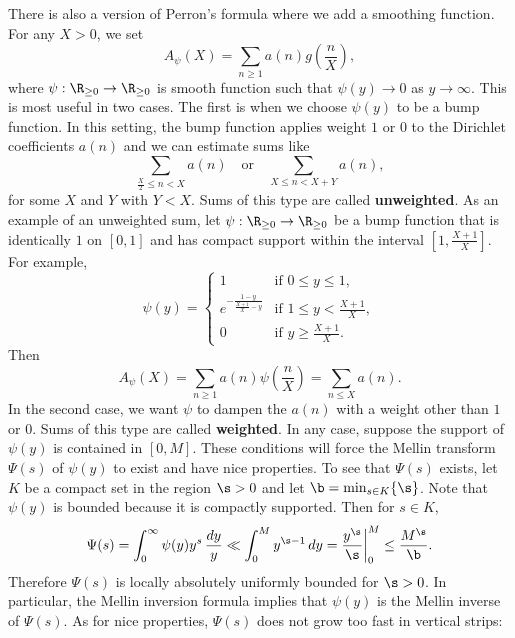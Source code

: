     There is also a version of Perron's formula where we add a smoothing function. For any $X > 0$, we set
    \[
      A_{\psi}(X) = \sum_{n \ge 1}a(n)g\left(\frac{n}{X}\right),
    \]
    where $\psi:\R_{\ge 0} \to \R_{\ge 0}$ is smooth function such that $\psi(y) \to 0$ as $y \to \infty$. This is most useful in two cases. The first is when we choose $\psi(y)$ to be a bump function. In this setting, the bump function applies weight $1$ or $0$ to the Dirichlet coefficients $a(n)$ and we can estimate sums like
    \[
      \sum_{\frac{X}{2} \le n < X}a(n) \quad \text{or} \quad \sum_{X \le n < X+Y}a(n),
    \]
    for some $X$ and $Y$ with $Y < X$. Sums of this type are called \textbf{unweighted}. As an example of an unweighted sum, let $\psi:\R_{\ge 0} \to \R_{\ge 0}$ be a bump function that is identically $1$ on $[0,1]$ and has compact support within the interval $\left[1,\frac{X+1}{X}\right]$. For example,
    \[
      \psi(y) = \begin{cases} 1 & \text{if $0 \le y \le 1$}, \\ e^{-\frac{1-y}{\frac{X+1}{X}-y}} & \text{if $1 \le y < \frac{X+1}{X}$}, \\ 0 & \text{if $y \ge \frac{X+1}{X}$}. \end{cases}
    \]
    Then 
    \[
      A_{\psi}(X) = \sum_{n \ge 1}a(n)\psi\left(\frac{n}{X}\right) = \sum_{n \le X}a(n).
    \]
    In the second case, we want $\psi$ to dampen the $a(n)$ with a weight other than $1$ or $0$. Sums of this type are called \textbf{weighted}. In any case, suppose the support of $\psi(y)$ is contained in $[0,M]$. These conditions will force the Mellin transform $\Psi(s)$ of $\psi(y)$ to exist and have nice properties. To see that $\Psi(s)$ exists, let $K$ be a compact set in the region $\s > 0$ and let $\b = \min_{s \in K}\{\s\}$. Note that $\psi(y)$ is bounded because it is compactly supported. Then for $s \in K$,
    \[
      \Psi(s) = \int_{0}^{\infty}\psi(y)y^{s}\,\frac{dy}{y} \ll \int_{0}^{M}y^{\s-1}\,dy = \frac{y^{\s}}{\s}\bigg|_{0}^{M} \le \frac{M^{\s}}{\b}.
    \]
    Therefore $\Psi(s)$ is locally absolutely uniformly bounded for $\s > 0$. In particular, the Mellin inversion formula implies that $\psi(y)$ is the Mellin inverse of $\Psi(s)$. As for nice properties, $\Psi(s)$ does not grow too fast in vertical strips:


